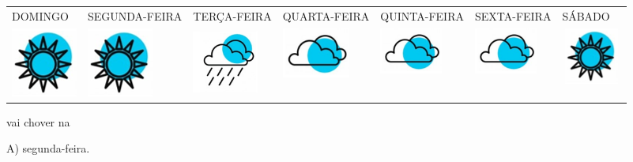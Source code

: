 \begin{longtable}[]{@{}llllll@{}}
\toprule
DOMINGO & SEGUNDA-FEIRA & TERÇA-FEIRA & QUARTA-FEIRA & QUINTA-FEIRA & SEXTA-FEIRA &
SÁBADO\tabularnewline
\includegraphics[width=0.85429in,height=0.89596in]{media/image136.png} &
\includegraphics[width=0.85429in,height=0.89596in]{media/image136.png} &
\includegraphics[width=0.85429in,height=0.89596in]{media/image138.png} &
\includegraphics[width=0.88247in,height=0.64865in]{media/image137.png} &
\includegraphics[width=0.81068in,height=0.59588in]{media/image137.png} &
\includegraphics[width=0.81068in,height=0.59588in]{media/image137.png} &
\includegraphics[width=0.77289in,height=0.73191in]{media/image136.png}\tabularnewline
\bottomrule
\end{longtable}

vai chover na

A) segunda-feira.

